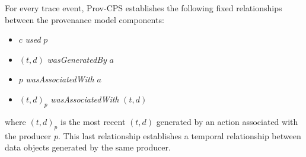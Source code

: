 For every trace event, Prov-CPS establishes the following fixed relationships between the provenance model components:
\begin{itemize}
 \item $c$ \textit{used} $p$
 \item $(t,d)$ \textit{wasGeneratedBy} $a$
 \item $p$ \textit{wasAssociatedWith} $a$
 \item $(t,d)_{p}$ \textit{wasAssociatedWith} $(t,d)$
\end{itemize}
where $(t,d)_{p}$ is the most recent $(t,d)$ generated by an action associated with the producer $p$. This last relationship establishes a temporal relationship between data objects generated by the same producer.

 
% 
% 


